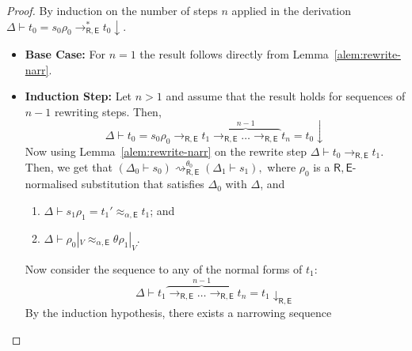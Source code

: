 \documentclass[11pt,a4paper]{amsart}
\newcommand{\ealeq}{\approx_{\alpha,\theory{E}}}
\newcommand{\theory}[1]{\ensuremath{\mathsf{#1}}}
\theoremstyle{plain}
\theoremstyle{definition}
\theoremstyle{remark}
\begin{document}
\begin{proof}
 By induction on the number of steps $n$ applied in the derivation $\Delta \vdash t_0 = s_0\rho_0\rightarrow_{\theory{R,E}}^* t_0{\downarrow}$.

\begin{itemize}
    \item \textbf{Base Case:} For $n=1$ the result follows directly from Lemma~\ref{alem:rewrite-narr}.

    \item \textbf{Induction Step:} Let $n>1$ and assume that the result holds for sequences of  $n-1$ rewriting steps.
    Then, 
    $$\Delta \vdash t_0 = s_0\rho_0\rightarrow_{\theory{R,E}} t_1\overbrace{\rightarrow_{\theory{R,E}}\ldots \rightarrow_{\theory{R,E}}}^{n-1} t_n=t_0{\downarrow}$$
    Now using Lemma~\ref{alem:rewrite-narr} on the rewrite step $\Delta \vdash t_0 \to_{\theory{R,E}} t_1$.  Then, we get that 
    $(\Delta_{0} \vdash s_{0}) \rightsquigarrow_{\theory{R,E}}^{\theta_{0}} (\Delta_1 \vdash s_1),$
   where $\rho_0$ is a $\theory{R,E}$-normalised substitution that satisfies $\Delta_0$ with $\Delta$, and
   \begin{enumerate}[{\bf (H1)}] 
   \item  $\Delta \vdash s_1\rho_1 = t_1' \ealeq t_1$; and 
   \item $\Delta \vdash \rho_0|_V \ealeq \theta\rho_1|_V$. 
   \end{enumerate} 
   Now consider the sequence to any of the normal forms of $t_1$:
      $$\Delta \vdash  t_1\overbrace{\rightarrow_{\theory{R,E}}\ldots \rightarrow_{\theory{R,E}}}^{n-1} t_n=t_1{\downarrow_\theory{R,E}}
      $$     
    By the induction hypothesis, there exists  a narrowing sequence 


\end{itemize}
\end{proof}
\end{document}
